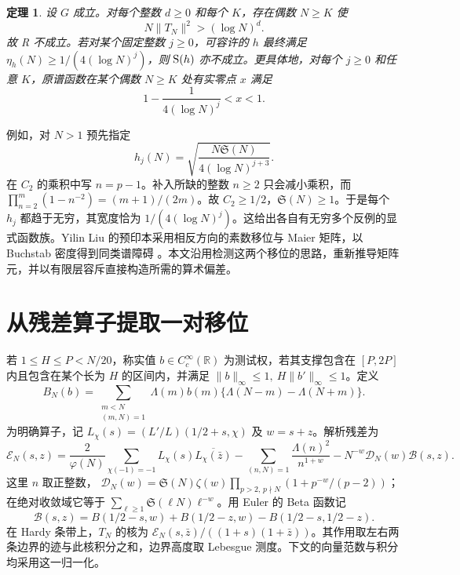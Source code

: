 \documentclass[UTF8,a4paper,11pt,fontset=fandol]{ctexart}
\newtheorem{theorem}{定理}
\newcommand{\Sg}{\mathfrak S}
\newcommand{\RR}{\mathbb R}
\newcommand{\Lam}{\Lambda}
\begin{document}
\begin{theorem}\label{th:main}
设 \(G\) 成立。对每个整数 \(d\ge0\) 和每个 \(K\)，存在偶数 \(N\ge K\) 使
\[
                    N\|T_N\|^2>(\log N)^d.                  \tag{1}
\]
故 R 不成立。若对某个固定整数 \(j\ge0\)，可容许的 \(h\) 最终满足
\(\eta_h(N)\ge 1/(4(\log N)^j)\)，则 \({\rm S}(h)\) 亦不成立。更具体地，对每个 \(j\ge0\) 和任意 \(K\)，原谱函数在某个偶数 \(N\ge K\) 处有实零点 \(x\) 满足
\[
            1-\frac{1}{4(\log N)^j}<x<1.
\]
\end{theorem}

例如，对 \(N>1\) 预先指定
\[
              h_j(N)=\sqrt{\frac{N\Sg(N)}{4(\log N)^{j+3}}}.
                                                               \tag{2}
\]
在 \(C_2\) 的乘积中写 \(n=p-1\)。补入所缺的整数 \(n\ge2\) 只会减小乘积，而
\(\prod_{n=2}^{m}(1-n^{-2})=(m+1)/(2m)\)。故 \(C_2\ge1/2\)，\(\Sg(N)\ge1\)。于是每个 \(h_j\) 都趋于无穷，其宽度恰为 \(1/(4(\log N)^j)\)。这给出各自有无穷多个反例的显式函数族。Yilin Liu 的预印本采用相反方向的素数移位与 Maier 矩阵，以 Buchstab 密度得到同类谱障碍 \cite{YL}。本文沿用检测这两个移位的思路，重新推导矩阵元，并以有限层容斥直接构造所需的算术偏差。

\section{从残差算子提取一对移位}
若 \(1\le H\le P<N/20\)，称实值 \(b\in C^\infty_c(\RR)\) 为测试权，若其支撑包含在 \([P,2P]\) 内且包含在某个长为 \(H\) 的区间内，并满足
\(\|b\|_\infty\le1,\ H\|b'\|_\infty\le1\)。定义
\[
 B_N(b)=\sum_{\substack{m<N\\(m,N)=1}}\Lam(m)b(m)
                      \{\Lam(N-m)-\Lam(N+m)\}.
\]
为明确算子，记 \(L_\chi(s)= (L'/L)(1/2+s,\chi)\) 及 \(w=s+z\)。解析残差为
\[
 \mathcal E_N(s,z)=\frac{2}{\varphi(N)}
 \sum_{\chi(-1)=-1} L_\chi(s)\overline{L_\chi(\bar z)}
 -\sum_{(n,N)=1}\frac{\Lam(n)^2}{n^{1+w}}
 -N^{-w}\mathcal D_N(w)\mathcal B(s,z).
\]
这里 \(n\) 取正整数，
\(\mathcal D_N(w)=\Sg(N)\zeta(w)\prod_{p>2,\,p\nmid N}(1+p^{-w}/(p-2))\)；
在绝对收敛域它等于 \(\sum_{\ell\ge1}\Sg(\ell N)\ell^{-w}\)。用 Euler 的 Beta 函数记
\[
 \mathcal B(s,z)=B(1/2-s,w)+B(1/2-z,w)-B(1/2-s,1/2-z).
\]
在 Hardy 条带上，\(T_N\) 的核为 \(\mathcal E_N(s,\bar z)/((1+s)(1+\bar z))\)。其作用取左右两条边界的迹与此核积分之和，边界高度取 Lebesgue 测度。下文的向量范数与积分均采用这一归一化。
\end{document}

